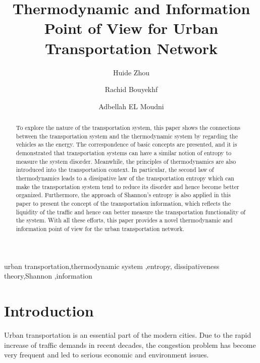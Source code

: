 \documentclass[preprint,authoryear,12pt]{elsarticle}
\begin{document}
\begin{frontmatter}

\title{Thermodynamic and Information Point of View for Urban
Transportation Network}
\author[SeT]{Huide Zhou}
\author[SeT]{Rachid Bouyekhf}
\author[SeT]{Adbellah EL Moudni}
\address[SeT]{Laboratoire Syst\`{e}mes et Transports (SeT),\\
Universit\'{e} de Technologie de Belfort-Montb\'{e}liard (UTBM)\\
Rue Thierry Mieg, 90010 Belfort Cedex, France}

\begin{abstract}
To explore the nature of the transportation system, this paper shows
the connections between the transportation system and the
thermodynamic system by regarding the vehicles as the energy. The
correspondence of basic concepts are presented, and it is demonstrated
that transportation systems can have a similar notion of entropy to
measure the system disorder. Meanwhile, the principles of
thermodynamics are also introduced into the transportation context.
In particular, the second law of thermodynamics leads to a
dissipative law of the transportation entropy which can make the
transportation system tend to reduce its disorder and hence become
better organized. Furthermore, the approach of Shannon's entropy is
also applied in this paper to present the concept of the
transportation information, which reflects the liquidity of the
traffic and hence can better measure the transportation functionality
of the system. With all these efforts, this paper provides a novel
thermodynamic and information point of view for the urban
transportation network.
\end{abstract}

\begin{keyword}
urban transportation\sep thermodynamic system \sep entropy\sep
dissipativeness theory\sep Shannon \sep information
\end{keyword}

\end{frontmatter}

\section{Introduction}

Urban transportation is an essential part of the modern cities. Due
to the rapid increase of traffic demands in recent decades, the
congestion problem has become very frequent and led to serious
economic and environment issues.
\end{document}
